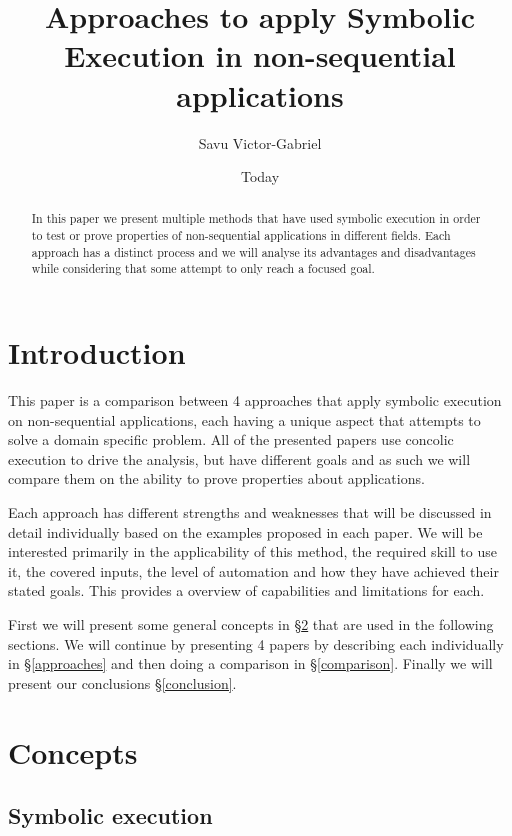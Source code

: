 \documentclass[10pt]{llncs}
\begin{document}
\title{Approaches to apply Symbolic Execution in non-sequential applications}
\author{Savu Victor-Gabriel}
\date{Today}
\maketitle

\begin{abstract}
	In this paper we present multiple methods that have used symbolic execution in order to test or prove properties of non-sequential applications in different fields. Each approach has a distinct process and we will analyse its advantages and disadvantages while considering that some attempt to only reach a focused goal.
\end{abstract}

\section{Introduction}

This paper is a comparison between 4 approaches that apply symbolic execution on non-sequential applications, each having a unique aspect that attempts to solve a domain specific problem. All of the presented papers use concolic execution to drive the analysis, but have different goals and as such we will compare them on the ability to prove properties about applications.

Each approach has different strengths and weaknesses that will be discussed in detail individually based on the examples proposed in each paper. We will be interested primarily in the applicability of this method, the required skill to use it, the covered inputs, the level of automation and how they have achieved their stated goals. This provides a overview of capabilities and limitations for each.

First we will present some general concepts in §\ref{concepts} that are used in the following sections. We will continue by presenting 4 papers \cite{base3, base4, base5, base7} by describing each individually in §\ref{approaches} and then doing a comparison in §\ref{comparison}. Finally we will present our conclusions §\ref{conclusion}.

\section{Concepts}
\label{concepts}

\subsection{Symbolic execution}
\end{document}
